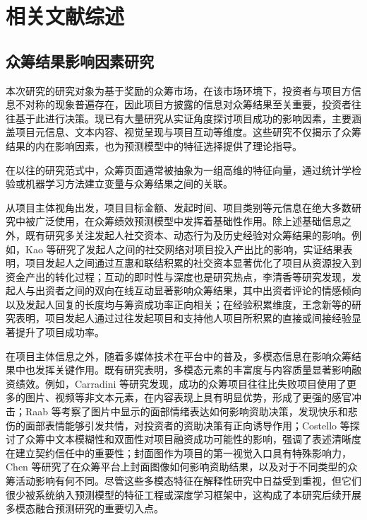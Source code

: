 \newpage
\setcounter{table}{0}
\setcounter{figure}{0}
\section{相关文献综述}
\subsection{众筹结果影响因素研究}
本次研究的研究对象为基于奖励的众筹市场，在该市场环境下，投资者与项目方信息不对称的现象普遍存在，因此项目方披露的信息对众筹结果至关重要，投资者往往基于此进行决策。现已有大量研究从实证角度探讨项目成功的影响因素，主要涵盖项目元信息、文本内容、视觉呈现与项目互动等维度。这些研究不仅揭示了众筹结果的内在影响因素，也为预测模型中的特征选择提供了理论指导。

在以往的研究范式中，众筹页面通常被抽象为一组高维的特征向量，通过统计学检验或机器学习方法建立变量与众筹结果之间的关联。

从项目主体视角出发，项目目标金额、发起时间、项目类别等元信息在绝大多数研究中被广泛使用，在众筹绩效预测模型中发挥着基础性作用。除上述基础信息之外，既有研究多关注发起人社交资本、动态行为及历史经验对众筹结果的影响。例如，Kao 等研究了发起人之间的社交网络对项目投入产出比的影响，实证结果表明，项目发起人之间通过互惠和联结积累的社交资本显著优化了项目从资源投入到资金产出的转化过程\cite{ref17}；互动的即时性与深度也是研究热点，李清香等研究发现，发起人与出资者之间的双向在线互动显著影响众筹结果，其中出资者评论的情感倾向以及发起人回复的长度均与筹资成功率正向相关\cite{ref18}；在经验积累维度，王念新等的研究表明，项目发起人通过过往发起项目和支持他人项目所积累的直接或间接经验显著提升了项目成功率\cite{ref19}。

在项目主体信息之外，随着多媒体技术在平台中的普及，多模态信息在影响众筹结果中也发挥关键作用。既有研究表明，多模态元素的丰富度与内容质量显著影响融资绩效。例如，Carradini 等研究发现，成功的众筹项目往往比失败项目使用了更多的图片、视频等非文本元素，在内容表现上具有明显优势，形成了更强的感官冲击\cite{ref20}；Raab 等考察了图片中显示的面部情绪表达如何影响资助决策，发现快乐和悲伤的面部表情能够引发共情，对投资者的资助决策有正向诱导作用\cite{ref21}；Costello 等探讨了众筹中文本模糊性和双面性对项目融资成功可能性的影响，强调了表述清晰度在建立契约信任中的重要性\cite{ref22}；封面图作为项目的第一视觉入口具有特殊影响力，Chen 等研究了在众筹平台上封面图像如何影响资助结果，以及对于不同类型的众筹活动影响有何不同\cite{ref23}。尽管这些多模态特征在解释性研究中日益受到重视，但它们很少被系统纳入预测模型的特征工程或深度学习框架中，这构成了本研究后续开展多模态融合预测研究的重要切入点。

